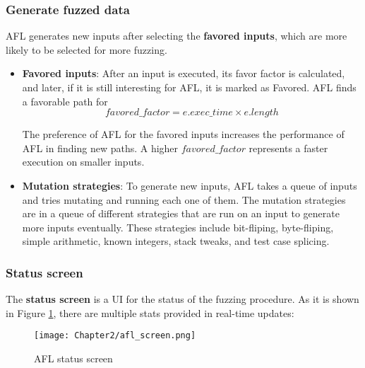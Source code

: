 \subsubsection*{Generate fuzzed data}
AFL generates new inputs after selecting the \textbf{favored inputs}, which are more likely to be selected for more fuzzing.

\begin{itemize}
    \item \textbf{Favored inputs}: After an input is executed, its favor factor is calculated, and later, if it is still interesting for AFL, it is marked as Favored. AFL finds a favorable path for  \cite{afl_git} 
    \begin{equation}
        favored\_factor = e.exec\_time \times e.length
        \label{eq:afl_fav_fac}
    \end{equation}
    
    The preference of AFL for the favored inputs increases the performance of AFL in finding new paths. A higher $favored\_factor$ represents a faster execution on smaller inputs.

    \item \textbf{Mutation strategies}: To generate new inputs, AFL takes a queue of inputs and tries mutating and running each one of them. The mutation strategies are in a queue of different strategies that are run on an input to generate more inputs eventually. These strategies include bit-fliping, byte-fliping, simple arithmetic, known integers, stack tweaks, and test case splicing. \cite{afl_strategies}
    
\end{itemize}

\subsubsection*{Status screen}

The \textbf{status screen} is a UI for the status of the fuzzing procedure. As it is shown in Figure \ref{fig:status_screen}, there are multiple stats provided in real-time updates:
    
\begin{figure}[!t]
    \texttt{[image: Chapter2/afl\_screen.png]}
    \centering
    \caption{AFL status screen}
    \label{fig:status_screen}
\end{figure} 

